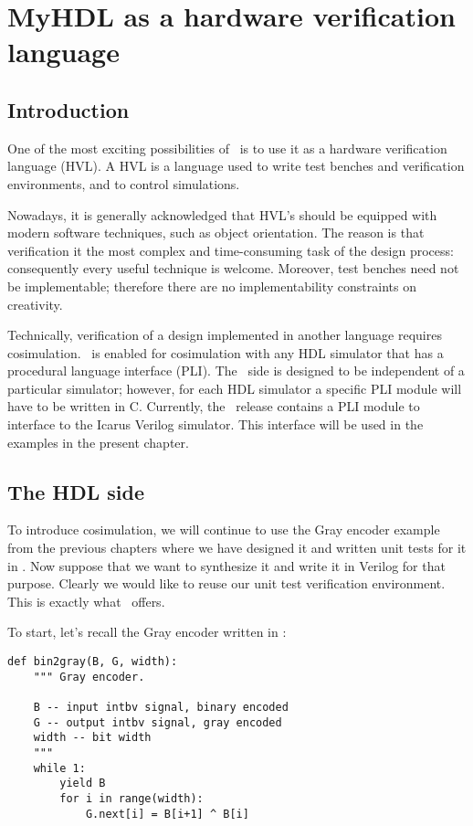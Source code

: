 \chapter{MyHDL as a hardware verification language}

\section{Introduction}

One of the most exciting possibilities of \myhdl\
is to use it as a hardware verification language (HVL).
A HVL is a language used to write test benches and
verification environments, and to control simulations.

Nowadays, it is generally acknowledged that HVL's 
should be equipped with modern software techniques,
such as object orientation. The reason is that verification
it the most complex and time-consuming task of the
design process: consequently every useful technique
is welcome. Moreover, test benches need not be 
implementable; therefore there are no implementability
constraints on creativity. 

Technically, verification of a design implemented in
another language requires cosimulation. \myhdl\ is 
enabled for cosimulation with any HDL simulator that
has a procedural language interface (PLI). The \myhdl\
side is designed to be independent of a particular
simulator; however, for each HDL simulator a specific
PLI module will have to be written in C. Currently,
the \myhdl\ release contains a PLI module to interface
to the Icarus Verilog simulator. This interface will
be used in the examples in the present chapter.

\section{The HDL side}

To introduce cosimulation, we will continue to use the Gray encoder
example from the previous chapters where we have designed it and
written unit tests for it in \myhdl{}. Now suppose that we want to
synthesize it and write it in Verilog for that purpose. Clearly we would
like to reuse our unit test verification environment. This is exactly
what \myhdl\ offers.

To start, let's recall the Gray encoder written in \myhdl{}:

\begin{verbatim}
def bin2gray(B, G, width):
    """ Gray encoder.

    B -- input intbv signal, binary encoded
    G -- output intbv signal, gray encoded
    width -- bit width
    """
    while 1:
        yield B
        for i in range(width):
            G.next[i] = B[i+1] ^ B[i]

\end{verbatim}

